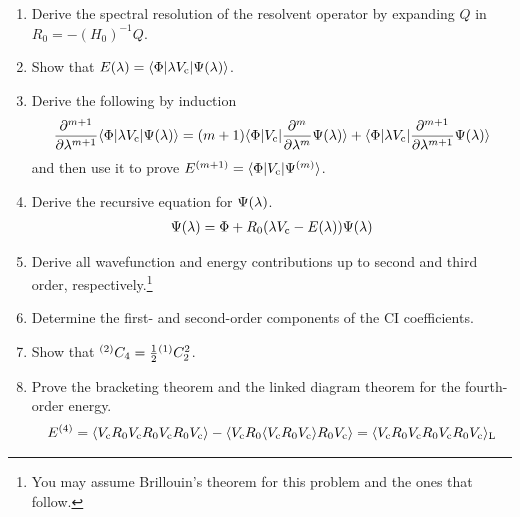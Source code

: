 \documentclass[11pt]{article}
\begin{document}
\begin{enumerate}
\item
Derive the spectral resolution of the resolvent operator by expanding $Q$ in
$
  R_0
=
-
  (H_0)^{-1}
  Q
$.


\item\label{item:energy-equation}
Show that
$
  E(\lambda )
=
  \langle\Phi |\lambda  V_{\mathrm{c}}|\Psi (\lambda )\rangle
$.

\item
Derive the following by induction
\begin{align}
  \frac {\partial^{m+1}}{\partial\lambda ^{m+1}}
  \langle\Phi |\lambda  V_{\mathrm{c}}|\Psi (\lambda )\rangle
=
  (m+1)
  \langle\Phi |V_{\mathrm{c}}|\frac {\partial^m}{\partial\lambda ^m}\Psi (\lambda )\rangle
+
  \langle\Phi |\lambda  V_{\mathrm{c}}|\frac {\partial^{m+1}}{\partial\lambda ^{m+1}}\Psi (\lambda )\rangle
\end{align}
and then use it to prove 
$
  E^{(m+1)}
=
  \langle\Phi |V_{\mathrm{c}}|\Psi ^{(m)}\rangle
$.


\item\label{item:recursive-wavefunction-equation}
Derive the recursive equation for $\Psi (\lambda )$.
\begin{align}
\label{eq:recursive-wavefunction-equation}
  \Psi (\lambda )
=
  \Phi 
+
  R_0
  (
    \lambda 
    V_{\mathrm{c}}
  -
    E(\lambda )
  )
  \Psi (\lambda )
\end{align}


\item
Derive all wavefunction and energy contributions up to second and third order, respectively.\footnote{You may assume Brillouin's theorem for this problem and the ones that follow.}


\item
Determine the first- and second-order components of the CI coefficients.

\item
Show that
$
  {}^{(2)}
  C_4
=
  \tfrac{1}{2}
  {}^{(1)}
  C_2^2
$.

\item
Prove the bracketing theorem and the linked diagram theorem for the fourth-order energy.
\begin{align*}
  E^{(4)}
=
  \langle V_{\mathrm{c}}R_0V_{\mathrm{c}}R_0V_{\mathrm{c}}R_0V_{\mathrm{c}}\rangle
-
  \langle V_{\mathrm{c}}R_0\langle V_{\mathrm{c}}R_0V_{\mathrm{c}}\rangle R_0V_{\mathrm{c}}\rangle
=
  \langle V_{\mathrm{c}}R_0V_{\mathrm{c}}R_0V_{\mathrm{c}}R_0V_{\mathrm{c}}\rangle_{\mathrm{L}}
\end{align*}

\end{enumerate}
\end{document}
